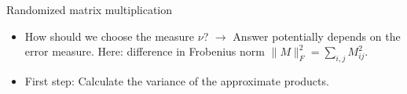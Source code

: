 \begin{algorithm}[H]
\SetAlgoLined
{}
 \BlankLine
{}
\label{algo2:random-matr-mult}
\caption{Randomized matrix multiplication}
\end{algorithm}
\begin{itemize}
	\item How should we choose the measure $\nu$?
		\subitem $\rightarrow$ Answer potentially depends on the error measure.
		\subitem  Here: difference in Frobenius norm $\|M\|_F^2 = \sum_{i,j}M_{ij}^2.$ 
	\item First step: Calculate the variance of the approximate products.
\end{itemize}

